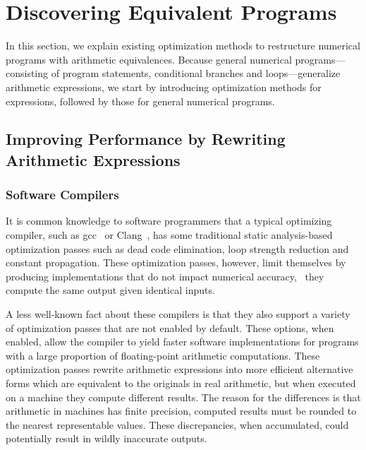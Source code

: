 \section{Discovering Equivalent Programs}
\label{bg:sec:discovering_equivalent_programs}

In this section, we explain existing optimization methods to restructure
numerical programs with arithmetic equivalences.  Because general numerical
programs---consisting of program statements, conditional branches and
loops---generalize arithmetic expressions, we start by introducing optimization
methods for expressions, followed by those for general numerical programs.


\subsection{Improving Performance by Rewriting Arithmetic Expressions}
\label{bg:sub:performance}

\subsubsection{Software Compilers}

It is common knowledge to software programmers that a typical optimizing
compiler, such as \gls{gcc}~\cite{gcc} or Clang~\cite{clang}, has some
traditional static analysis-based optimization passes such as dead code
elimination, loop strength reduction and constant propagation.  These
optimization passes, however, limit themselves by producing implementations
that do not impact numerical accuracy, \ie~they compute the same output given
identical inputs.

A less well-known fact about these compilers is that they also support a
variety of optimization passes that are not enabled by default.  These options,
when enabled, allow the compiler to yield faster software implementations for
programs with a large proportion of floating-point arithmetic computations.
These optimization passes rewrite arithmetic expressions into more efficient
alternative forms which are equivalent to the originals in real arithmetic,
but when executed on a machine they compute different results.  The reason
for the differences is that arithmetic in machines has finite precision,
computed results must be rounded to the nearest representable values.  These
discrepancies, when accumulated, could potentially result in wildly inaccurate
outputs.

